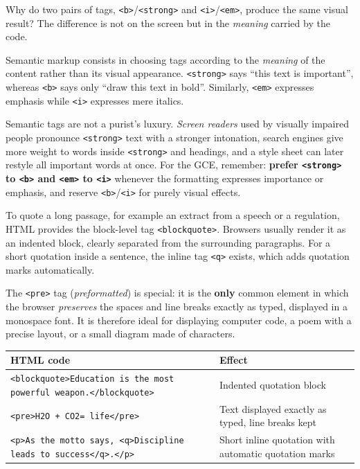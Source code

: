 \documentclass[11pt]{article}
\newcommand{\cle}[1]{{\popxbold\color{popdark}#1}}
\newcounter{popsec}
\newcounter{popsub}
\newcommand{\courssub}[1]{%
  \stepcounter{popsub}%
  \par\vspace{9pt}\noindent{\popxbold\fontsize{11.5}{13}\selectfont\color{popink}{\color{poporange}\thepopsec.\thepopsub}\hspace{6pt}#1}\par\nopagebreak\vspace{4pt}
}
\begin{document}
Why do two pairs of tags, \texttt{<b>}/\texttt{<strong>} and \texttt{<i>}/\texttt{<em>}, produce the same visual result? The difference is not on the screen but in the \emph{meaning} carried by the code.

\begin{definition}
\cle{Semantic markup} consists in choosing tags according to the \emph{meaning} of the content rather than its visual appearance. \texttt{<strong>} says ``this text is important'', whereas \texttt{<b>} says only ``draw this text in bold''. Similarly, \texttt{<em>} expresses emphasis while \texttt{<i>} expresses mere italics.
\end{definition}

\begin{savaistu}
Semantic tags are not a purist's luxury. \emph{Screen readers} used by visually impaired people pronounce \texttt{<strong>} text with a stronger intonation, search engines give more weight to words inside \texttt{<strong>} and headings, and a style sheet can later restyle all important words at once. For the GCE, remember: \textbf{prefer \texttt{<strong>} to \texttt{<b>} and \texttt{<em>} to \texttt{<i>}} whenever the formatting expresses importance or emphasis, and reserve \texttt{<b>}/\texttt{<i>} for purely visual effects.
\end{savaistu}

\courssub{Quotations and preformatted text}

To quote a long passage, for example an extract from a speech or a regulation, HTML provides the block-level tag \texttt{<blockquote>}. Browsers usually render it as an indented block, clearly separated from the surrounding paragraphs. For a short quotation inside a sentence, the inline tag \texttt{<q>} exists, which adds quotation marks automatically.

The \texttt{<pre>} tag (\emph{preformatted}) is special: it is the \textbf{only} common element in which the browser \emph{preserves} the spaces and line breaks exactly as typed, displayed in a monospace font. It is therefore ideal for displaying computer code, a poem with a precise layout, or a small diagram made of characters.

\begin{exemplebox}
\begin{center}
\begin{tabularx}{\linewidth}{|l|X|}
\hline
\rowcolor{popblueL} \textbf{HTML code} & \textbf{Effect} \\
\hline
\texttt{<blockquote>Education is the most powerful weapon.</blockquote>} & Indented quotation block \\
\hline
\texttt{<pre>H2O + CO2\newline = life</pre>} & Text displayed exactly as typed, line breaks kept \\
\hline
\texttt{<p>As the motto says, <q>Discipline leads to success</q>.</p>} & Short inline quotation with automatic quotation marks \\
\hline
\end{tabularx}
\end{center}
\end{exemplebox}
\end{document}
